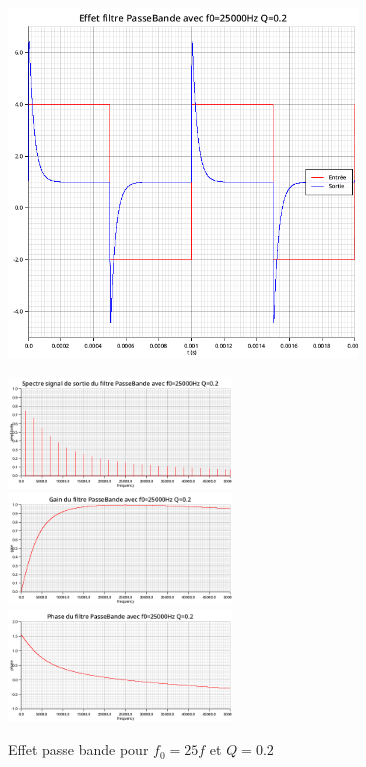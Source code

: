 \documentclass{article}
\begin{document}
\begin{figure}[H]
  \begin{minipage}{0.6\textwidth}
      \centering
      \includegraphics[width=25em]{images/creneau/bande/q=0.2/25/signals.png}
  \end{minipage}
  \begin{minipage}{0.3\textwidth}
      \centering
      \includegraphics[width=16em]{images/creneau/bande/q=0.2/25/fft_out.png}
      \vfill
      \includegraphics[width=16em]{images/creneau/bande/q=0.2/25/gain.png}
      \vfill
      \includegraphics[width=16em]{images/creneau/bande/q=0.2/25/phase.png}
  \end{minipage}
  \caption{Effet passe bande pour $f_0=25f$ et $Q=0.2$}
\end{figure}
\end{document}
